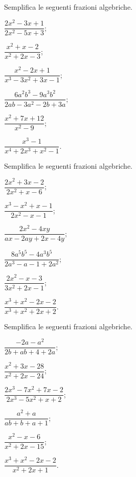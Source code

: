 \begin{esercizio}[\Ast]
\label{ese:14.8}
Semplifica le seguenti frazioni algebriche.
\begin{multicols}{3}
\begin{enumeratea}
 \item $\dfrac{2x^{2}-3x+1}{2x^{2}-5x+3}$;
 \item $\dfrac{x^{2}+x-2}{x^{2}+2x-3}$;
 \item $\dfrac{x^{2}-2x+1}{x^{3}-3x^{2}+3x-1}$;
 \item $\dfrac{6a^{2}b^{3}-9a^{3}b^{2}}{2ab-3a^{2}-2b+3a}$;
 \item $\dfrac{x^{2}+7x+12}{x^{2}-9}$;
 \item $\dfrac{x^{3}-1}{x^{4}+2x^{3}+x^{2}-1}$.
\end{enumeratea}
\end{multicols}
\end{esercizio}

\begin{esercizio}[\Ast]
\label{ese:14.9}
Semplifica le seguenti frazioni algebriche.
\begin{multicols}{3}
\begin{enumeratea}
 \item $\dfrac{2x^{2}+3x-2}{2x^{2}+x-6}$;
 \item $\dfrac{x^{3}-x^{2}+x-1}{2x^{2}-x-1}$;
 \item $\dfrac{2x^{2}-4xy}{ax-2ay+2x-4y}$;
 \item $\dfrac{8a^{5}b^{5}-4a^{3}b^{5}}{2a^{3}-a-1+2a^{2}}$;
 \item $\dfrac{2x^{2}-x-3}{3x^{2}+2x-1}$;
 \item $\dfrac{x^{3}+x^{2}-2x-2}{x^{3}+x^{2}+2x+2}$.
\end{enumeratea}
\end{multicols}
\end{esercizio}

\begin{esercizio}[\Ast]
\label{ese:14.10}
Semplifica le seguenti frazioni algebriche.
\begin{multicols}{3}
\begin{enumeratea}
 \item $\dfrac{-2a-a^{2}}{2b+ab+4+2a}$;
 \item $\dfrac{x^{2}+3x-28}{x^{2}+2x-24}$;
 \item $\dfrac{2x^{3}-7x^{2}+7x-2}{2x^{3}-5x^{2}+x+2}$;
 \item $\dfrac{a^{2}+a}{ab+b+a+1}$;
 \item $\dfrac{x^{2}-x-6}{x^{2}+2x-15}$;
 \item $\dfrac{x^{3}+x^{2}-2x-2}{x^{2}+2x+1}$.
\end{enumeratea}
\end{multicols}
\end{esercizio}

